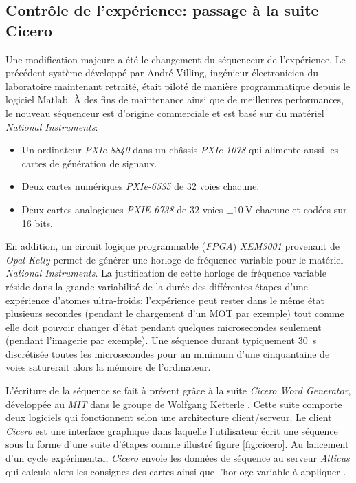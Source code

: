 \subsection{Contrôle de l'expérience: passage à la suite Cicero}
\label{sc:cicero}
Une modification majeure a été le changement du séquenceur de l'expérience. Le précédent système développé par André Villing, ingénieur électronicien du laboratoire maintenant retraité, était piloté de manière programmatique depuis le logiciel Matlab. À des fins de maintenance ainsi que de meilleures performances, le nouveau séquenceur est d'origine commerciale et est basé sur du matériel \emph{National Instruments}:
\begin{itemize}
\item[\textendash] Un ordinateur \emph{PXIe-8840} dans un châssis \emph{PXIe-1078} qui alimente aussi les cartes de génération de signaux.
\item[\textendash] Deux cartes numériques \emph{PXIe-6535} de 32 voies chacune.
\item[\textendash] Deux cartes analogiques \emph{PXIE-6738} de 32 voies $\pm \SI{10}{\volt}$ chacune et codées sur 16 bits.
\end{itemize}
En addition, un circuit logique programmable (\emph{FPGA}) \emph{XEM3001} provenant de \emph{Opal-Kelly} permet de générer une horloge de fréquence variable pour le matériel \emph{National Instruments}. La justification de cette horloge de fréquence variable réside dans la grande variabilité de la durée des différentes étapes d'une expérience d'atomes ultra-froids: l'expérience peut rester dans le même état plusieurs secondes (pendant le chargement d'un MOT par exemple) tout comme elle doit pouvoir changer d'état pendant quelques microsecondes seulement (pendant l'imagerie par exemple). Une séquence durant typiquement \SI{30}{\second} discrétisée toutes les microsecondes pour un minimum d'une cinquantaine de voies saturerait alors la mémoire de l'ordinateur. 

L'écriture de la séquence se fait à présent grâce à la suite \emph{Cicero Word Generator}, développée au \emph{MIT} dans le groupe de Wolfgang Ketterle \citep{keshet2013distributed}. Cette suite comporte deux logiciels qui fonctionnent selon une architecture client/serveur. Le client \emph{Cicero} est une interface graphique dans laquelle l'utilisateur écrit une séquence sous la forme d'une suite d'étapes comme illustré figure \ref{fig:cicero}. Au lancement d'un cycle expérimental, \emph{Cicero} envoie les données de séquence au serveur \emph{Atticus} qui calcule alors les consignes des cartes ainsi que l'horloge variable à appliquer \citep{keshet2008cicero}.

